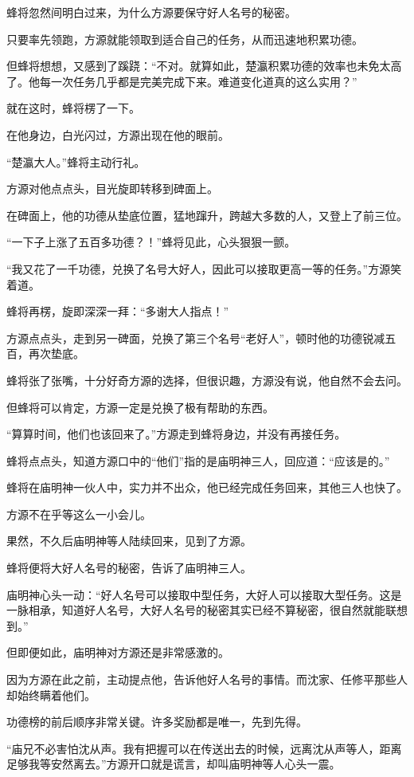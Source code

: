 \begin{this_body}
蜂将忽然间明白过来，为什么方源要保守好人名号的秘密。

只要率先领跑，方源就能领取到适合自己的任务，从而迅速地积累功德。

但蜂将想想，又感到了蹊跷：“不对。就算如此，楚瀛积累功德的效率也未免太高了。他每一次任务几乎都是完美完成下来。难道变化道真的这么实用？”

就在这时，蜂将楞了一下。

在他身边，白光闪过，方源出现在他的眼前。

“楚瀛大人。”蜂将主动行礼。

方源对他点点头，目光旋即转移到碑面上。

在碑面上，他的功德从垫底位置，猛地蹿升，跨越大多数的人，又登上了前三位。

“一下子上涨了五百多功德？！”蜂将见此，心头狠狠一颤。

“我又花了一千功德，兑换了名号大好人，因此可以接取更高一等的任务。”方源笑着道。

蜂将再楞，旋即深深一拜：“多谢大人指点！”

方源点点头，走到另一碑面，兑换了第三个名号“老好人”，顿时他的功德锐减五百，再次垫底。

蜂将张了张嘴，十分好奇方源的选择，但很识趣，方源没有说，他自然不会去问。

但蜂将可以肯定，方源一定是兑换了极有帮助的东西。

“算算时间，他们也该回来了。”方源走到蜂将身边，并没有再接任务。

蜂将点点头，知道方源口中的“他们”指的是庙明神三人，回应道：“应该是的。”

蜂将在庙明神一伙人中，实力并不出众，他已经完成任务回来，其他三人也快了。

方源不在乎等这么一小会儿。

果然，不久后庙明神等人陆续回来，见到了方源。

蜂将便将大好人名号的秘密，告诉了庙明神三人。

庙明神心头一动：“好人名号可以接取中型任务，大好人可以接取大型任务。这是一脉相承，知道好人名号，大好人名号的秘密其实已经不算秘密，很自然就能联想到。”

但即便如此，庙明神对方源还是非常感激的。

因为方源在此之前，主动提点他，告诉他好人名号的事情。而沈家、任修平那些人却始终瞒着他们。

功德榜的前后顺序非常关键。许多奖励都是唯一，先到先得。

“庙兄不必害怕沈从声。我有把握可以在传送出去的时候，远离沈从声等人，距离足够我等安然离去。”方源开口就是谎言，却叫庙明神等人心头一震。


\end{this_body}
